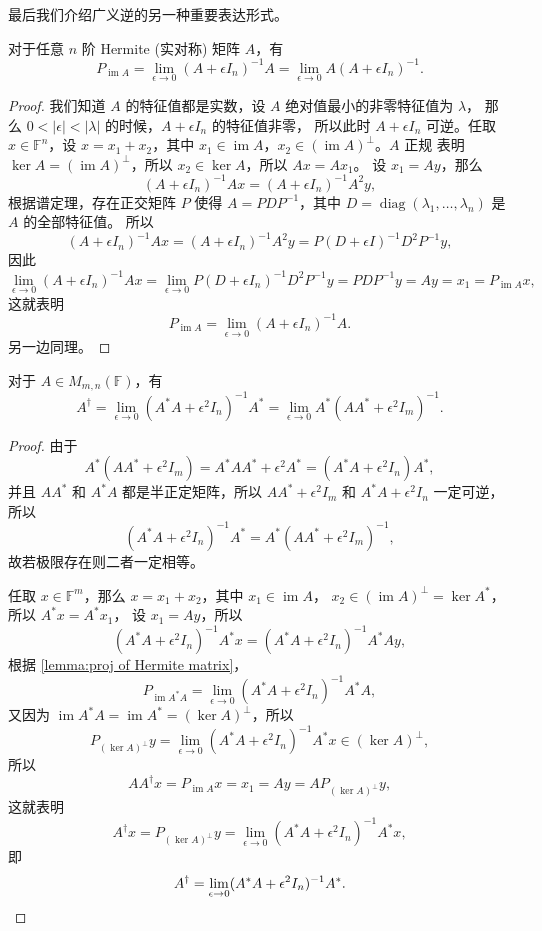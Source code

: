 \documentclass[fontset=none,zihao=-4]{Notes}
\DeclareMathOperator\im{im}
\DeclareMathOperator\diag{diag}
\begin{document}
最后我们介绍广义逆的另一种重要表达形式。

\begin{lemma}\label{lemma:proj of Hermite matrix}
  对于任意 $n$ 阶 Hermite (实对称) 矩阵 $A$，有
  \[
    P_{\im A}=\lim_{\epsilon\to 0}(A+\epsilon I_n)^{-1}A=\lim_{\epsilon\to 0}A(A+\epsilon I_n)^{-1}.
  \]
\end{lemma}
\begin{proof}
  我们知道 $A$ 的特征值都是实数，设 $A$ 绝对值最小的非零特征值为 $\lambda$，
  那么 $0<|\epsilon|<|\lambda|$ 的时候，$A+\epsilon I_n$ 的特征值非零，
  所以此时 $A+\epsilon I_n$ 可逆。任取 $x\in\mathbb{F}^n$，设
  $x=x_1+x_2$，其中 $x_1\in\im A$，$x_2\in(\im A)^\bot$。$A$ 正规
  表明 $\ker A=(\im A)^\bot$，所以 $x_2\in\ker A$，所以 $Ax=Ax_1$。
  设 $x_1=Ay$，那么
  \[
    (A+\epsilon I_n)^{-1}Ax=(A+\epsilon I_n)^{-1}A^2 y,  
  \]
  根据谱定理，存在正交矩阵 $P$ 使得 $A=PDP^{-1}$，其中
  $D=\diag(\lambda_1,\dots,\lambda_n)$ 是 $A$ 的全部特征值。
  所以
  \[
    (A+\epsilon I_n)^{-1}Ax=(A+\epsilon I_n)^{-1}A^2 y=P(D+\epsilon I)^{-1}
    D^2P^{-1}y,
  \]
  因此
  \[
    \lim_{\epsilon\to 0} (A+\epsilon I_n)^{-1}Ax=\lim_{\epsilon\to 0}
    P(D+\epsilon I_n)^{-1}D^2P^{-1}y=PDP^{-1}y=Ay=x_1=P_{\im A}x,  
  \]
  这就表明
  \[
    P_{\im A}=  \lim_{\epsilon\to 0} (A+\epsilon I_n)^{-1}A.
  \]
  另一边同理。
\end{proof}

\begin{theorem}
  对于 $A\in M_{m,n}(\mathbb{F})$，有
  \[
    A^\dagger=\lim_{\epsilon\to 0}(A^*A+\epsilon^2 I_n)^{-1}A^*=
    \lim_{\epsilon\to 0}A^*  (AA^*+\epsilon^2 I_m)^{-1}.
  \]
\end{theorem}
\begin{proof}
  由于
  \[
    A^*(AA^*+\epsilon^2 I_m)=A^*AA^*+\epsilon^2A^*=(A^*A+\epsilon^2 I_n)A^*,
  \]
  并且 $AA^*$ 和 $A^*A$ 都是半正定矩阵，所以 $AA^*+\epsilon^2 I_m$
  和 $A^*A+\epsilon^2I_n$ 一定可逆，所以
  \[
    (A^*A+\epsilon^2 I_n)^{-1}A^*=A^*  (AA^*+\epsilon^2 I_m)^{-1},
  \]
  故若极限存在则二者一定相等。

  任取 $x\in\mathbb{F}^m$，那么 $x=x_1+x_2$，其中 $x_1\in\im A$，
  $x_2\in (\im A)^\bot=\ker A^*$，所以 $A^*x=A^*x_1$，
  设 $x_1=Ay$，所以
  \[
    (A^*A+\epsilon^2 I_n)^{-1}A^*x=  (A^*A+\epsilon^2 I_n)^{-1}A^*Ay,
  \]
  根据 \autoref{lemma:proj of Hermite matrix}，
  \[
    P_{\im A^*A}=  \lim_{\epsilon\to 0} (A^*A+\epsilon^2 I_n)^{-1}A^*A,
  \]
  又因为 $\im A^*A=\im A^*=(\ker A)^\bot$，所以
  \[
    P_{(\ker A)^\bot}y=\lim_{\epsilon\to 0}(A^*A+\epsilon^2 I_n)^{-1}A^*x\in (\ker A)^\bot,
  \]
  所以
  \[
    AA^\dagger x=P_{\im A}x=x_1=Ay=AP_{(\ker A)^\bot}y,  
  \]
  这就表明
  \[
    A^\dagger x=P_{(\ker A)^\bot}y=  \lim_{\epsilon\to 0}(A^*A+\epsilon^2 I_n)^{-1}A^*x,
  \]
  即
  \[
    A^\dagger=\lim_{\epsilon\to 0}(A^*A+\epsilon^2 I_n)^{-1}A^*.\qedhere  
  \]
\end{proof}
\end{document}
